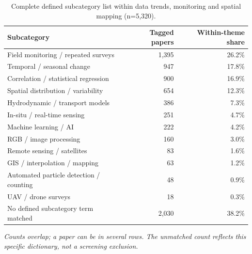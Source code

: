 \documentclass[10pt,a4paper]{article}
\begin{document}
\begin{table}[H]\centering\footnotesize
\caption{Complete defined subcategory list within data trends, monitoring and spatial mapping (n=5,320).}
\begin{tabularx}{\linewidth}{@{}Xrr@{}}\toprule Subcategory & Tagged papers & Within-theme share \\ \midrule
Field monitoring / repeated surveys & 1,395 & 26.2\% \\
Temporal / seasonal change & 947 & 17.8\% \\
Correlation / statistical regression & 900 & 16.9\% \\
Spatial distribution / variability & 654 & 12.3\% \\
Hydrodynamic / transport models & 386 & 7.3\% \\
In-situ / real-time sensing & 251 & 4.7\% \\
Machine learning / AI & 222 & 4.2\% \\
RGB / image processing & 160 & 3.0\% \\
Remote sensing / satellites & 83 & 1.6\% \\
GIS / interpolation / mapping & 63 & 1.2\% \\
Automated particle detection / counting & 48 & 0.9\% \\
UAV / drone surveys & 18 & 0.3\% \\
\midrule
No defined subcategory term matched & 2,030 & 38.2\% \\
\bottomrule\end{tabularx}\end{table}
\noindent\footnotesize\emph{Counts overlap; a paper can be in several rows. The unmatched count reflects this specific dictionary, not a screening exclusion.}\normalsize
\end{document}
